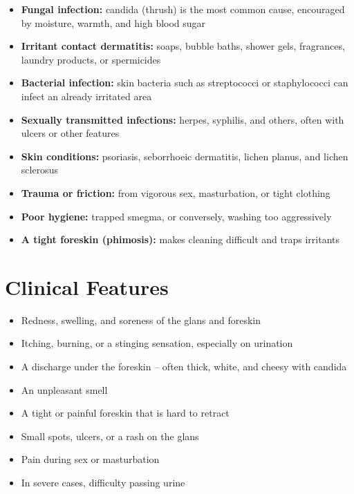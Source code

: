 \begin{itemize}
    \item \textbf{Fungal infection:} candida (thrush) is the most common cause, encouraged by moisture, warmth, and high blood sugar
    \item \textbf{Irritant contact dermatitis:} soaps, bubble baths, shower gels, fragrances, laundry products, or spermicides
    \item \textbf{Bacterial infection:} skin bacteria such as streptococci or staphylococci can infect an already irritated area
    \item \textbf{Sexually transmitted infections:} herpes, syphilis, and others, often with ulcers or other features
    \item \textbf{Skin conditions:} psoriasis, seborrhoeic dermatitis, lichen planus, and lichen sclerosus
    \item \textbf{Trauma or friction:} from vigorous sex, masturbation, or tight clothing
    \item \textbf{Poor hygiene:} trapped smegma, or conversely, washing too aggressively
    \item \textbf{A tight foreskin (phimosis):} makes cleaning difficult and traps irritants
\end{itemize}

\section*{Clinical Features}
\begin{itemize}
    \item Redness, swelling, and soreness of the glans and foreskin
    \item Itching, burning, or a stinging sensation, especially on urination
    \item A discharge under the foreskin -- often thick, white, and cheesy with candida
    \item An unpleasant smell
    \item A tight or painful foreskin that is hard to retract
    \item Small spots, ulcers, or a rash on the glans
    \item Pain during sex or masturbation
    \item In severe cases, difficulty passing urine
\end{itemize}

